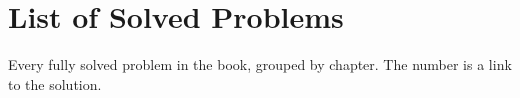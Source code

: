 \chapter{List of Solved Problems}

Every fully solved problem in the book, grouped by chapter. The number is a
link to the solution.

\listofsolvedproblems
